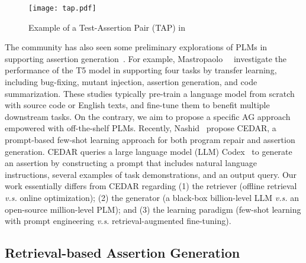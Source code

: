 \begin{figure}[t]
	\graphicspath{{figs/}}
	\centering
	\texttt{[image: tap.pdf]}
	\caption{Example of a Test-Assertion Pair (TAP) in \atla{}}
	\label{fig:tap}
\end{figure}

The community has also seen some preliminary explorations of PLMs in supporting assertion generation~\cite{tufano2022generating, mastropaolo2021studying, mastropaolo2022using,zhang2024exploring}.
For example, Mastropaolo~\etal~\cite{mastropaolo2022using} investigate the performance of the T5 model in supporting four tasks by transfer learning, including bug-fixing, mutant injection, assertion generation, and code summarization.
These studies typically pre-train a language model from scratch with source code or English texts, and fine-tune them to benefit multiple downstream tasks.
On the contrary, we aim to propose a specific AG approach \toolname{} empowered with off-the-shelf PLMs.
Recently, Nashid~\cite{nashid2023retrieval} propose CEDAR, a prompt-based few-shot learning approach for both program repair and assertion generation.
CEDAR queries a large language model (LLM) Codex~\cite{chen2021evaluating} to generate an assertion by constructing a prompt that includes natural language instructions, several examples of task demonstrations, and an output query.
Our work essentially differs from CEDAR regarding (1) the retriever (offline retrieval \textit{v.s.} online optimization); (2) the generator (a black-box billion-level LLM \textit{v.s.} an open-source million-level PLM); and (3) the learning paradigm (few-shot learning with prompt engineering \textit{v.s.} retrieval-augmented fine-tuning). 

\subsection{Retrieval-based Assertion Generation}


